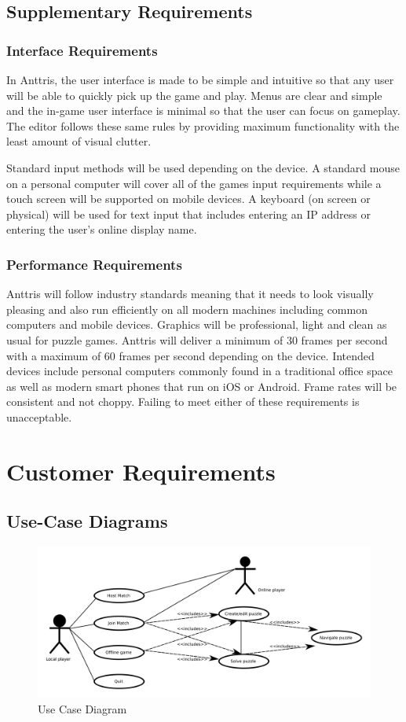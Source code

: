 \documentclass[12pt]{article}
\begin{document}
\subsection{Supplementary Requirements} %
\subsubsection{Interface Requirements}
In Anttris, the user interface is made to be simple and intuitive so that any user will be able to quickly pick up the game and play. Menus are clear and simple and the in-game user interface is minimal so that the user can focus on gameplay. The editor follows these same rules by providing maximum functionality with the least amount of visual clutter.

Standard input methods will be used depending on the device. A standard mouse on a personal computer will cover all of the games input requirements while a touch screen will be supported on mobile devices. A keyboard (on screen or physical) will be used for text input that includes entering an IP address or entering the user's online display name.

\subsubsection{Performance Requirements}
Anttris will follow industry standards meaning that it needs to look visually pleasing and also run efficiently on all modern machines including common computers and mobile devices. Graphics will be professional, light and clean as usual for puzzle games. Anttris will deliver a minimum of 30 frames per second with a maximum of 60 frames per second depending on the device. Intended devices include personal computers commonly found in a traditional office space as well as modern smart phones that run on iOS or Android. Frame rates will be consistent and not choppy. Failing to meet either of these requirements is unacceptable.

\section{Customer Requirements}
\subsection{Use-Case Diagrams}
    \begin{figure}[H]
        \centering
        \includegraphics[width=6in]{use_cases.png}
        \caption{Use Case Diagram}
    \end{figure}
\end{document}
